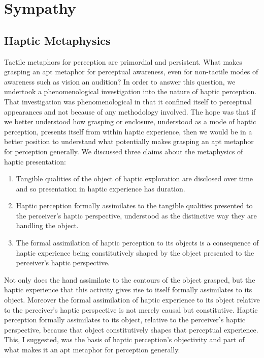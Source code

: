 \chapter{Sympathy} %
\label{cha:sympathy}


\section{Haptic Metaphysics} %
\label{sec:the_metaphysics_of_haptic_presentation}

Tactile metaphors for perception are primordial and persistent. What makes grasping an apt metaphor for perceptual awareness, even for non-tactile modes of awareness such as vision an audition? In order to answer this question, we undertook a phenomenological investigation into the nature of haptic perception. That investigation was phenomenological in that it confined itself to perceptual appearances and not because of any methodology involved. The hope was that if we better understood how grasping or enclosure, understood as a mode of haptic perception, presents itself from within haptic experience, then we would be in a better position to understand what potentially makes grasping an apt metaphor for perception generally. We discussed three claims about the metaphysics of haptic presentation:
\begin{enumerate}[(1)]
	\item Tangible qualities of the object of haptic exploration are disclosed over time and so presentation in haptic experience has duration.
	\item Haptic perception formally assimilates to the tangible qualities presented to the perceiver's haptic perspective, understood as the distinctive way they are handling the object.
	\item The formal assimilation of haptic perception to its objects is a consequence of haptic experience being constitutively shaped by the object presented to the perceiver's haptic perspective.
\end{enumerate}
Not only does the hand assimilate to the contours of the object grasped, but the haptic experience that this activity gives rise to itself formally assimilates to its object. Moreover the formal assimilation of haptic experience to its object relative to the perceiver's haptic perspective is not merely causal but constitutive. Haptic perception formally assimilates to its object, relative to the perceiver's haptic perspective, because that object constitutively shapes that perceptual experience. This, I suggested, was the basis of haptic perception's objectivity and part of what makes it an apt metaphor for perception generally. 

